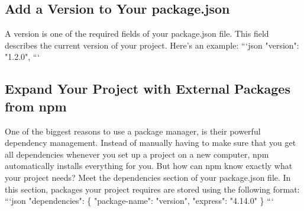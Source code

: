 \documentclass{article}%
\begin{document}
%
\subsection{Add a Version to Your package.json}%
\label{subsec:AddaVersiontoYourpackage.json}%
A version is one of the required fields of your package.json file. This field describes the current version of your project. Here's an example:\newline%
```json\newline%
"version": "1.2.0",\newline%
```\newline%

%
\subsection{Expand Your Project with External Packages from npm}%
\label{subsec:ExpandYourProjectwithExternalPackagesfromnpm}%
One of the biggest reasons to use a package manager, is their powerful dependency management. Instead of manually having to make sure that you get all dependencies whenever you set up a project on a new computer, npm automatically installs everything for you. But how can npm know exactly what your project needs? Meet the dependencies section of your package.json file.\newline%
In this section, packages your project requires are stored using the following format:\newline%
```json\newline%
"dependencies": \{\newline%
  "package{-}name": "version",\newline%
  "express": "4.14.0"\newline%
\}\newline%
```\newline%

%
\end{document}
